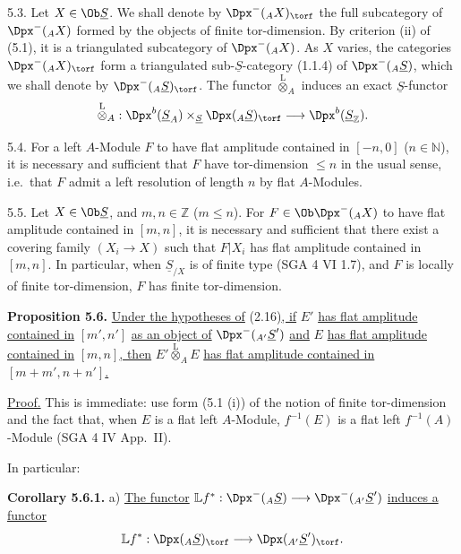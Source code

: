 5.3. Let \(X\in\Ob \underline{S}\). We shall denote by \(\Dpx^-({}_A X)_{\torf}\) the full subcategory of \(\Dpx^-({}_A X)\) formed by the objects of finite tor-dimension. By criterion (ii) of (5.1), it is a triangulated subcategory of \(\Dpx^-({}_A X)\). As \(X\) varies, the categories \(\Dpx^-({}_A X)_{\torf}\) form a triangulated sub-\(\underline{S}\)-category (1.1.4) of \(\Dpx^-({}_A \underline{S})\), which we shall denote by \(\Dpx^-({}_A \underline{S})_{\torf}\). The functor \(\overset{\mathrm L}{\otimes}_A\) induces an exact \(\underline{S}\)-functor
\[
  \overset{\mathrm L}{\otimes}_A:
  \Dpx^b(\underline{S}_A)\times_{\underline{S}} \Dpx({}_A \underline{S})_{\torf}
  \longrightarrow \Dpx^b(\underline{S}_{\mathbb Z}).
\]

5.4. For a left \(A\)-Module \(F\) to have flat amplitude contained in \([-n,0]\) (\(n\in\mathbb N\)), it is necessary and sufficient that \(F\) have tor-dimension \(\leq n\) in the usual sense, i.e.\ that \(F\) admit a left resolution of length \(n\) by flat \(A\)-Modules.

%
5.5. Let \(X\in\Ob \underline{S}\), and \(m,n\in\mathbb Z\) (\(m\leq n\)). For \(F\in\Ob\Dpx^-({}_A X)\) to have flat amplitude contained in \([m,n]\), it is necessary and sufficient that there exist a covering family \((X_i\to X)\) such that \(F|X_i\) has flat amplitude contained in \([m,n]\). In particular, when \(\underline{S}_{/X}\) is of finite type (SGA 4 VI 1.7), and \(F\) is locally of finite tor-dimension, \(F\) has finite tor-dimension.

\textbf{Proposition 5.6.} \uline{Under the hypotheses of} (2.16)\uline{, if} \(E'\) \uline{has flat amplitude contained in} \([m',n']\) \uline{as an object of} \(\Dpx^-({}_{A'} \underline{S}')\) \uline{and} \(E\) \uline{has flat amplitude contained in} \([m,n]\)\uline{, then} \(E'\overset{\mathrm L}{\otimes}_A E\) \uline{has flat amplitude contained in} \([m+m',n+n']\)\uline{.}

\uline{Proof.} This is immediate: use form (5.1 (i)) of the notion of finite tor-dimension and the fact that, when \(E\) is a flat left \(A\)-Module, \(f^{-1}(E)\) is a flat left \(f^{-1}(A)\)-Module (SGA 4 IV App.\ II).

In particular:

\textbf{Corollary 5.6.1.} a) \uline{The functor} \(\mathbb L f^*:\Dpx^-({}_A \underline{S})\longrightarrow \Dpx^-({}_{A'} \underline{S}')\) \uline{induces a functor}
\[
  \mathbb L f^*:\Dpx({}_A \underline{S})_{\torf}\longrightarrow \Dpx({}_{A'} \underline{S}')_{\torf}.
\]

